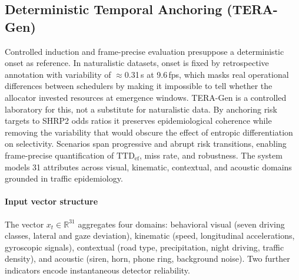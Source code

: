 \documentclass[a4paper,fleqn]{cas-dc}
\newcommand{\TERAGen}{\mbox{TERA-Gen}\xspace}
\begin{document}
\subsection{Deterministic Temporal Anchoring (\mbox{TERA-Gen})}
\label{sec:tera_gen}
Controlled induction and frame-precise evaluation presuppose a deterministic
onset as reference. In naturalistic datasets, onset is fixed by retrospective
annotation with variability of $\approx$0.31\,s at 9.6\,fps, which masks real
operational differences between schedulers by making it impossible to tell
whether the allocator invested resources at emergence windows. \TERAGen is a
controlled laboratory for this, not a substitute for naturalistic data. By
anchoring risk targets to SHRP2 odds ratios it preserves epidemiological
coherence while removing the variability that would obscure the effect of
entropic differentiation on selectivity.
Scenarios span progressive and abrupt risk transitions, enabling frame-precise
quantification of $\mathrm{TTD}_{\mathrm{ef}}$, miss rate, and robustness. The
system models 31 attributes across visual, kinematic, contextual, and acoustic
domains grounded in traffic epidemiology.
\paragraph{Input vector structure}
The vector $x_t \in \mathbb{R}^{31}$ aggregates four domains: behavioral visual
(seven driving classes, lateral and gaze deviation), kinematic (speed,
longitudinal accelerations, gyroscopic signals), contextual (road type,
precipitation, night driving, traffic density), and acoustic (siren, horn,
phone ring, background noise). Two further indicators encode instantaneous
detector reliability.
\end{document}
